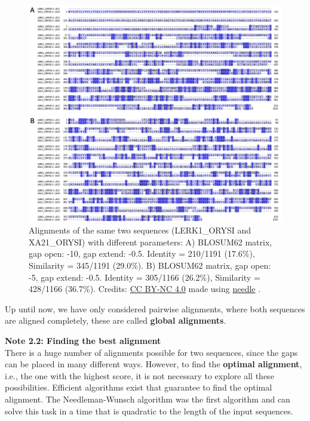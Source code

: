 \begin{figure}[!htbp]
\centering
\includegraphics[width=1\linewidth]{files/alg_gap-a25ce3110d8094cc1b4da311bca7e507.png}
\caption[]{Alignments of the same two sequences (LERK1\_ORYSI and XA21\_ORYSI) with different parameters:
A) BLOSUM62 matrix, gap open: -10, gap extend: -0.5. Identity = 210/1191 (17.6\%), Similarity = 345/1191 (29.0\%).
B) BLOSUM62 matrix, gap open: -5, gap extend: -0.5. Identity = 305/1166 (26.2\%), Similarity = 428/1166 (36.7\%).
Credits: \href{https://creativecommons.org/licenses/by-nc/4.0/}{CC BY-NC 4.0} \cite{own_2_2024} made using \href{https://www.ebi.ac.uk/jdispatcher/psa/emboss\_needle}{needle} \cite{EMBL_tools_2022}.}
\label{alg_gap}
\end{figure}

Up until now, we have only considered pairwise alignments, where both sequences are aligned completely, these are called \textbf{global alignments}.

\begin{framed}
\textbf{Note 2.2: Finding the best alignment}\\
There is a huge number of alignments possible for two sequences, since the gaps can be placed in many different ways.
However, to find the \textbf{optimal alignment}, i.e., the one with the highest score, it is not necessary to explore all these possibilities.
Efficient algorithms exist that guarantee to find the optimal alignment.
The Needleman-Wunsch algorithm was the first algorithm and can solve this task in a time that is quadratic to the length of the input sequences.
\end{framed}


